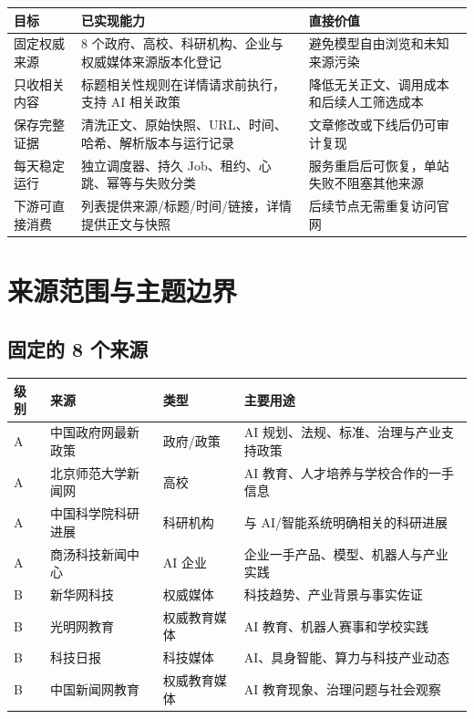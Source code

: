 \documentclass[UTF8,11pt,a4paper,fontset=none]{ctexart}
\begin{document}
\noindent\begin{tabularx}{\textwidth}{L{3.0cm}YY}
\toprule
{}
\color{white}\bfseries\sffamily 目标 &
\color{white}\bfseries\sffamily 已实现能力 &
\color{white}\bfseries\sffamily 直接价值 \\
\midrule
固定权威来源 & 8 个政府、高校、科研机构、企业与权威媒体来源版本化登记 & 避免模型自由浏览和未知来源污染 \\
只收相关内容 & 标题相关性规则在详情请求前执行，支持 AI 相关政策 & 降低无关正文、调用成本和后续人工筛选成本 \\
保存完整证据 & 清洗正文、原始快照、URL、时间、哈希、解析版本与运行记录 & 文章修改或下线后仍可审计复现 \\
每天稳定运行 & 独立调度器、持久 Job、租约、心跳、幂等与失败分类 & 服务重启后可恢复，单站失败不阻塞其他来源 \\
下游可直接消费 & 列表提供来源/标题/时间/链接，详情提供正文与快照 & 后续节点无需重复访问官网 \\
\bottomrule
\end{tabularx}

\section{来源范围与主题边界}

\subsection{固定的 8 个来源}

\noindent\begin{tabularx}{\textwidth}{L{1.1cm}L{4.0cm}L{3.6cm}Y}
\toprule
{}
\color{white}\bfseries 级别 & \color{white}\bfseries 来源 &
\color{white}\bfseries 类型 & \color{white}\bfseries 主要用途 \\
\midrule
A & 中国政府网最新政策 & 政府/政策 & AI 规划、法规、标准、治理与产业支持政策 \\
A & 北京师范大学新闻网 & 高校 & AI 教育、人才培养与学校合作的一手信息 \\
A & 中国科学院科研进展 & 科研机构 & 与 AI/智能系统明确相关的科研进展 \\
A & 商汤科技新闻中心 & AI 企业 & 企业一手产品、模型、机器人与产业实践 \\
B & 新华网科技 & 权威媒体 & 科技趋势、产业背景与事实佐证 \\
B & 光明网教育 & 权威教育媒体 & AI 教育、机器人赛事和学校实践 \\
B & 科技日报 & 科技媒体 & AI、具身智能、算力与科技产业动态 \\
B & 中国新闻网教育 & 权威教育媒体 & AI 教育现象、治理问题与社会观察 \\
\bottomrule
\end{tabularx}
\end{document}
